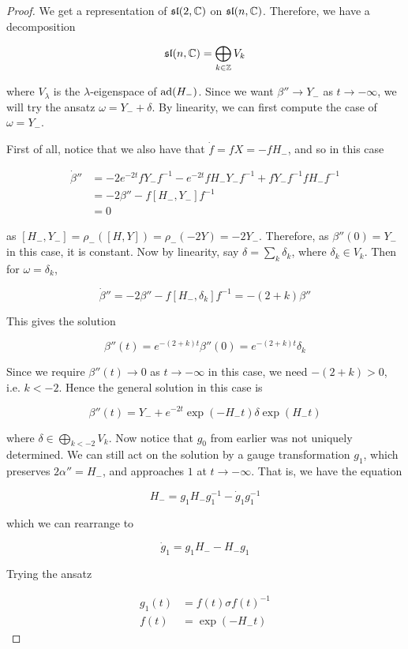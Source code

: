 \documentclass{report}
\renewcommand{\sl}{\mathfrak{sl}}
\begin{document}
\begin{proof}
    We get a representation of \(\sl(2, \C)\) on \(\sl(n, \C)\). Therefore, we have a decomposition

    \[\sl(n, \C) = \bigoplus_{k \in \Z}V_k\]

    where \(V_\lambda\) is the \(\lambda\)-eigenspace of \(\operatorname{ad}(H_-)\). Since we want \(\beta'' \to Y_-\) as \(t \to -\infty\), we will try the ansatz \(\omega = Y_- + \delta\). By linearity, we can first compute the case of \(\omega = Y_-\).

    First of all, notice that we also have that \(\dot f = f X = -fH_-\), and so in this case

    \begin{align*}
        \dot\beta'' &= -2e^{-2t}f Y_- f^{-1} - e^{-2t}f H_- Y_- f^{-1} + fY_-f^{-1}fH_-f^{-1} \\
        &= -2\beta'' - f[H_-, Y_-]f^{-1} \\
        &= 0
    \end{align*}

    as \([H_-, Y_-] = \rho_-([H, Y]) = \rho_-(-2Y) = -2Y_-\). Therefore, as \(\beta''(0) = Y_-\) in this case, it is constant. Now by linearity, say \(\delta = \sum_k \delta_k\), where \(\delta_k \in V_k\). Then for \(\omega = \delta_k\),

    \[\dot\beta'' = -2\beta'' - f[H_-, \delta_k]f^{-1} = -(2+k)\beta''\]

    This gives the solution

    \[\beta''(t) = e^{-(2+k)t}\beta''(0) = e^{-(2+k)t}\delta_k\]

    Since we require \(\beta''(t) \to 0\) as \(t \to -\infty\) in this case, we need \(-(2+k) > 0\), i.e. \(k < -2\). Hence the general solution in this case is

    \[\beta''(t) = Y_- + e^{-2t}\exp(-H_-t)\delta\exp(H_-t)\]

    where \(\delta \in \bigoplus\limits_{k < -2}V_k\). Now notice that \(g_0\) from earlier was not uniquely determined. We can still act on the solution by a gauge transformation \(g_1\), which preserves \(2\alpha'' = H_-\), and approaches \(1\) at \(t \to -\infty\). That is, we have the equation

    \[H_- = g_1H_-g_1^{-1} - \dot g_1 g_1^{-1}\]

    which we can rearrange to

    \[\dot g_1 = g_1H_- - H_- g_1\]

    Trying the ansatz

    \begin{align*}
        g_1(t) &= f(t)\sigma f(t)^{-1} \\
        f(t) &= \exp(-H_- t)
    \end{align*}


\end{proof}
\end{document}
